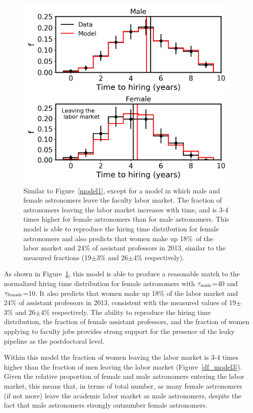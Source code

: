 \documentclass[modern]{aastex62}
\begin{document}
\begin{figure}[!hbt]
\center
\includegraphics[scale=.6]{model3.png}
\caption{Similar to Figure~\ref{model1}, except for a model in which male and female astronomers leave the faculty labor market. The fraction of astronomers leaving the labor market increases with time, and is 3-4 times higher for female astronomers than for male astronomers. This model is able to reproduce the hiring time distribution for female astronomers and also predicts that women make up 18\%\ of the labor market and 24\% of assistant professors in 2013, similar to the measured fractions (19$\pm$3\% and 26$\pm$4\% respectively).  \label{model3}}
\end{figure}

As shown in Figure~\ref{model3}, this model is able to produce a reasonable match to the normalized hiring time distribution for female astronomers with $\tau_{\rm male}$=40 and $\tau_{\rm female}$=10. It also predicts that women make up 18\% of the labor market and 24\% of assistant professors in 2013, consistent with the measured values of 19$\pm$3\% \citep{tho15} and 26$\pm$4\% \citep{hug14} respectively. The ability to reproduce the hiring time distribution, the fraction of female assistant professors, and the fraction of women applying to faculty jobs provides strong support for the presence of the leaky pipeline as the postdoctoral level. 

Within this model the fraction of women leaving the labor market is 3-4 times higher than the fraction of men leaving the labor market (Figure~\ref{df_model3}). Given the relative proportion of female and male astronomers entering the labor market, this means that, in terms of total number, as many female astronomers (if not more) leave the academic labor market as male astronomers, despite the fact that male astronomers strongly outnumber female astronomers. 
\end{document}

